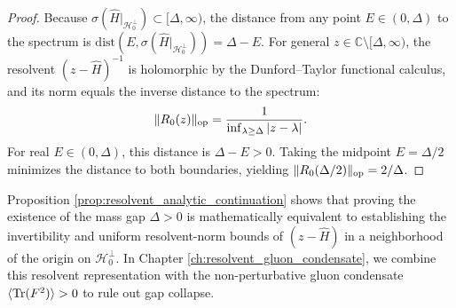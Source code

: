 \begin{proof}
Because $\sigma(\hat{H}|_{\mathcal{H}_0^\perp}) \subset [\Delta, \infty)$, the distance from any point $E \in (0, \Delta)$ to the spectrum is $\mathrm{dist}(E, \sigma(\hat{H}|_{\mathcal{H}_0^\perp})) = \Delta - E$. For general $z \in \mathbb{C} \setminus [\Delta, \infty)$, the resolvent $(z - \hat{H})^{-1}$ is holomorphic by the Dunford--Taylor functional calculus, and its norm equals the inverse distance to the spectrum:
\begin{equation}
\|R_0(z)\|_{\mathrm{op}} = \frac{1}{\inf_{\lambda \ge \Delta} |z - \lambda|}.
\end{equation}
For real $E \in (0, \Delta)$, this distance is $\Delta - E > 0$. Taking the midpoint $E = \Delta/2$ minimizes the distance to both boundaries, yielding $\|R_0(\Delta/2)\|_{\mathrm{op}} = 2/\Delta$.
\end{proof}

Proposition \ref{prop:resolvent_analytic_continuation} shows that proving the existence of the mass gap $\Delta > 0$ is mathematically equivalent to establishing the invertibility and uniform resolvent-norm bounds of $(z - \hat{H})$ in a neighborhood of the origin on $\mathcal{H}_0^\perp$. In Chapter \ref{ch:resolvent_gluon_condensate}, we combine this resolvent representation with the non-perturbative gluon condensate $\langle \mathrm{Tr}(F^2) \rangle > 0$ to rule out gap collapse.
